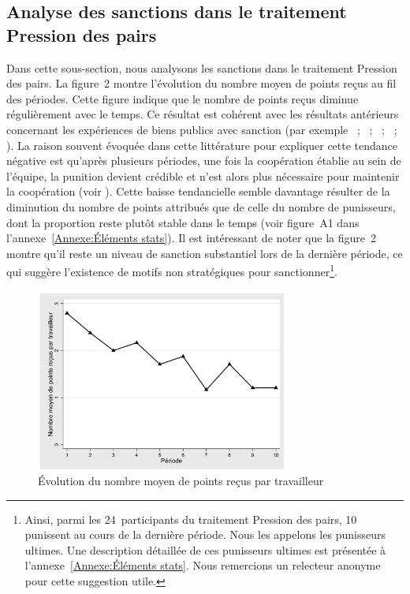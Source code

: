 \begin{Article}
\begin{refsection}[Lebourges]
\subsection{Analyse des sanctions dans le traitement Pression des pairs}

Dans cette sous-section, nous analysons les sanctions dans le traitement
Pression des pairs. La figure~2 montre l'évolution du nombre moyen de
points reçus au fil des périodes. Cette figure indique que le nombre de
points reçus diminue régulièrement avec le temps. Ce résultat est
cohérent avec les résultats antérieurs concernant les expériences de
biens publics avec sanction (par exemple \textcite{Nikiforakis2008}~;
\textcite{GächterRennerSefton2008}~; \textcite{MascletVilleval2008}~;
\textcite{NikiforakisEngelmann2011}~; \textcite{DickinsonMasclet2015}).
La raison souvent évoquée dans cette littérature pour expliquer cette
tendance négative est qu'après plusieurs périodes, une fois la
coopération établie au sein de l'équipe, la punition devient crédible et
n'est alors plus nécessaire pour maintenir la coopération (voir \textcite{GächterRennerSefton2008}). Cette baisse tendancielle semble davantage
résulter de la diminution du nombre de points attribués que de celle du
nombre de punisseurs, dont la proportion reste plutôt stable dans le
temps (voir figure~A1 dans l'annexe~\ref{Annexe:Éléments stats}). Il est intéressant de noter que la figure~2 montre qu'il reste un niveau de sanction substantiel
lors de la dernière période, ce qui suggère l'existence de motifs non
stratégiques pour sanctionner\footnote{Ainsi, parmi les
  24~participants du traitement Pression des pairs, 10 punissent au
  cours de la dernière période. Nous les appelons les punisseurs
  ultimes. Une description détaillée de ces punisseurs ultimes est
  présentée à l'annexe~\ref{Annexe:Éléments stats}. Nous remercions un relecteur anonyme pour
  cette suggestion utile.}.

\begin{figure}[h]
    \centering
    \caption{Évolution du nombre moyen de points reçus par travailleur}
    \includegraphics[height=6cm]{05_graph2.png}
\end{figure}


\end{refsection}
\end{Article}
